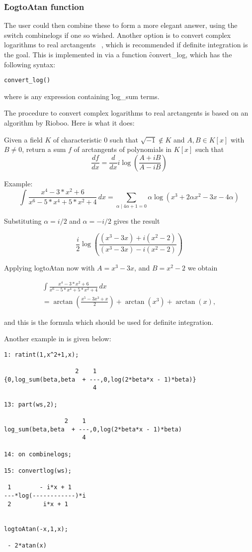 \subsubsection{\f{LogtoAtan} function}
The user could then combine these to form a more elegant answer, using the switch combinelogs if one so wished. Another option is to convert complex logarithms to real arctangents ~\cite{Bronstein:97}, which is recommended if definite integration is the goal. This is implemented in \REDUCE via a function \f{convert\_log}, which has the following syntax:
\begin{syntax}
  \texttt{convert\_log()}
\end{syntax}
where  is any expression containing \f{log\_sum} terms.

The procedure to convert complex logarithms to real arctangents is based on an algorithm by Rioboo. Here is what it does:

Given a field $K$ of characteristic 0 such that $\sqrt{-1} \not\in K$ and
$A, B \in K[x]$ with $B \not = 0$, return a sum $f$ of arctangents of polynomials in $K[x]$ such that
\[  \frac{df}{dx}=\frac{d}{dx} i \log(\frac{A+ i B}{A- i B}) \]

Example:
\[ \int \frac{x^4-3*x^2+6}{x^6-5*x^4+5*x^2+4} \, dx = \sum_{ \alpha \mid 4\alpha+1=0} \alpha \log(x^3+2\alpha x^2-3 x-4 \alpha) \]

Substituting $\alpha=i/2$ and $\alpha=-i/2$ gives the result

\[ \frac{i}{2} \log(\frac{(x^3-3 x)+i (x^2-2)}{(x^3-3 x)-i (x^2-2)}) \]

Applying logtoAtan now with $A=x^3-3 x$, and $B=x^2-2$ we obtain

\[
  \begin{split}
    \int \frac{x^4-3*x^2+6}{x^6-5*x^4+5*x^2+4} \, dx \\
    = \arctan(\frac{x^5-3 x^3+x}{2})+\arctan(x^3)+\arctan(x) ,
  \end{split}
\]

and this is the formula which should be used for definite integration.

Another example in \REDUCE is given below:
\begin{verbatim}
1: ratint(1,x^2+1,x);

                    2    1
{0,log_sum(beta,beta  + ---,0,log(2*beta*x - 1)*beta)}
                         4

13: part(ws,2);

                 2    1
log_sum(beta,beta  + ---,0,log(2*beta*x - 1)*beta)
                      4

14: on combinelogs;

15: convertlog(ws);

 1        - i*x + 1
---*log(------------)*i
 2         i*x + 1


logtoAtan(-x,1,x);

 - 2*atan(x)
\end{verbatim}

